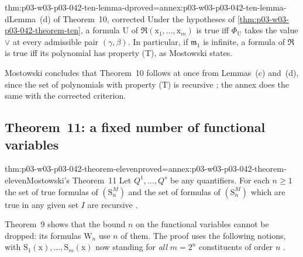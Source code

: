 \begin{hblemma}{thm:p03-w03-p03-042-ten-lemma-d}{proved=annex:p03-w03-p03-042-ten-lemma-d}{Lemma~(d) of Theorem~10, corrected}
Under the hypotheses of \cref{thm:p03-w03-p03-042-theorem-ten}, a formula
\(\mathrm U\) of \(\mathfrak R(\mathrm x_1,\ldots,\mathrm x_m)\) is true
iff \(\Phi_{\mathrm U}\) takes the value \(\vee\) at every admissible pair
\((\gamma,\beta)\).  In particular, if \(\mathfrak m_1\) is infinite, a
formula of \(\mathfrak R\) is true iff its polynomial has property (T),
as Mostowski states.
\end{hblemma}

Mostowski concludes that Theorem~10 follows at once from Lemmas~(c)
and~(d), since the set of polynomials with property (T) is recursive
\cite[p.~32]{Mostowski1957}; the annex does the same with the corrected
criterion.

\subsection{Theorem~11: a fixed number of functional variables}

\begin{hbtheorem}{thm:p03-w03-p03-042-theorem-eleven}{proved=annex:p03-w03-p03-042-theorem-eleven}{Mostowski's Theorem~11}
Let \(Q^1,\ldots,Q^s\) be any quantifiers.  For each \(n\geq1\) the set of
true formulas of \((\mathrm S^M_n)\) and the set of formulas of
\((\mathrm S^M_n)\) which are true in any given set \(I\) are recursive
\cite[p.~32]{Mostowski1957}.
\end{hbtheorem}

Theorem~9 shows that the bound \(n\) on the functional variables cannot be
dropped: its formulas \(\mathrm W_n\) use \(n\) of them.  The proof uses
the following notions, with \(\mathrm S_1(\mathrm x),\ldots,\mathrm
S_m(\mathrm x)\) now standing for \emph{all} \(m=2^n\) constituents of
order \(n\) \cite[p.~32]{Mostowski1957}.

